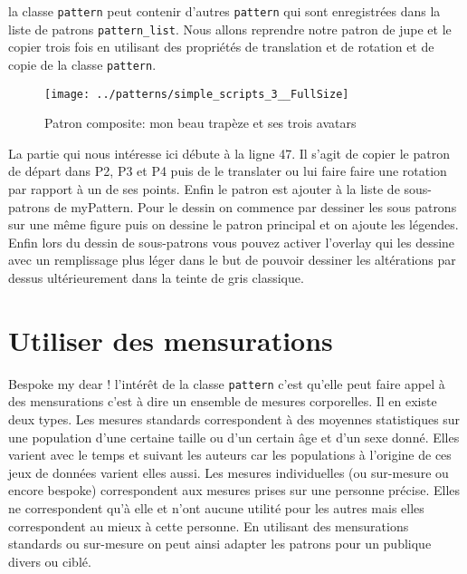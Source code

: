 \documentclass[10pt,a4paper,twoside]{report}
\begin{document}
la classe \texttt{pattern} peut contenir d'autres \texttt{pattern} qui sont enregistrées dans la liste de patrons \texttt{pattern\_list}. Nous allons reprendre notre patron de jupe et le copier trois fois en utilisant des propriétés de translation et de rotation et de copie de la classe \texttt{pattern}.




\begin{figure}
\begin{center}
\texttt{[image: ../patterns/simple\_scripts\_3\_\_FullSize]}
\end{center}
\caption{Patron composite: mon beau trapèze et ses trois avatars}
\label{fig:trapeze}
\end{figure}

La partie qui nous intéresse ici débute à la ligne 47. Il s'agit de copier le patron de départ dans P2, P3 et P4 puis de le translater ou lui faire faire une rotation par rapport à un de ses points. Enfin le patron est ajouter à la liste de sous-patrons de myPattern. Pour le dessin on commence par dessiner les sous patrons sur une même figure puis on dessine le patron principal et on ajoute les légendes. Enfin lors du dessin de sous-patrons vous pouvez activer l'overlay qui les dessine avec un remplissage plus léger dans le but de pouvoir dessiner les altérations par dessus ultérieurement dans la teinte de gris classique.


\section{Utiliser des mensurations}

Bespoke my dear ! l'intérêt de la classe \texttt{pattern} c'est qu'elle peut faire appel à des mensurations c'est à dire un ensemble de mesures corporelles. Il en existe deux types. Les mesures standards correspondent à des moyennes statistiques sur une population d'une certaine taille ou d'un certain âge et d'un sexe donné. Elles varient avec le temps et suivant les auteurs car les populations à l'origine de ces jeux de données varient elles aussi. Les mesures individuelles (ou sur-mesure ou encore bespoke) correspondent aux mesures prises sur une personne précise. Elles ne correspondent qu'à elle et n'ont aucune utilité pour les autres mais elles correspondent au mieux à cette personne.
En utilisant des mensurations standards ou sur-mesure on peut ainsi adapter les patrons pour un publique divers ou ciblé.
\end{document}
